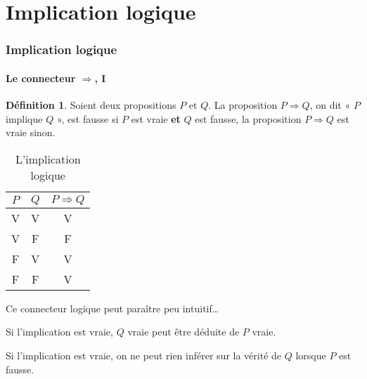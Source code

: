 \documentclass[10pt,notheorems]{beamer}
\theoremstyle{plain}
\theoremstyle{definition} %
\newtheorem{definition}{Définition}
\begin{document}
\section{Implication logique}

\begin{frame}
  \frametitle{Implication logique}
  \framesubtitle{Le connecteur $\Rightarrow$, I}
  \hypertarget{slide_implication_1}{}
  \begin{definition}

    Soient deux propositions $P$ et $Q$. La proposition
    $P\Rightarrow Q$, on dit « $P$ implique $Q$ », est fausse si $P$
    est vraie \textbf{et} $Q$ est fausse, la proposition
    $P\Rightarrow Q$ est vraie sinon.
  \end{definition}


  \begin{table}[H]

    \centering
    \begin{tabular}[H]{|cc|c|}
      \hline
      $P$ & $Q$ & $P \Rightarrow Q$\\ \hline
      V & V & V \\
      V & F & F \\
      F & V & V \\
      F & F & V \\
      \hline\hline
    \end{tabular}
    \caption{L'implication logique}
    \label{tab:implication}
  \end{table}

  Ce connecteur logique peut paraître peu intuitif\ldots\newline

  Si l'implication est vraie, $Q$ vraie peut être déduite de $P$ vraie.\newline

  Si l'implication est vraie, on ne peut rien inférer sur la vérité de $Q$ lorsque $P$ est fausse.\newline

\end{frame}
\end{document}
